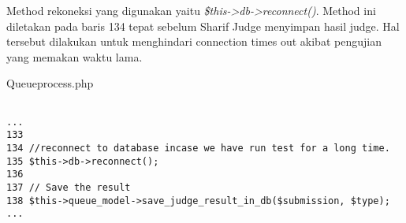 Method rekoneksi yang digunakan yaitu \textit{\$this->db->reconnect()}. Method ini diletakan pada baris 134 tepat sebelum Sharif Judge menyimpan hasil judge. Hal tersebut dilakukan untuk menghindari connection times out akibat pengujian yang memakan waktu lama.

Queueprocess.php
\begin{lstlisting}[basicstyle=\ttfamily, frame=single,
columns=fullflexible, keepspaces=true]

...
133
134	//reconnect to database incase we have run test for a long time.
135	$this->db->reconnect();
136
137	// Save the result
138	$this->queue_model->save_judge_result_in_db($submission, $type);
...

\end{lstlisting}